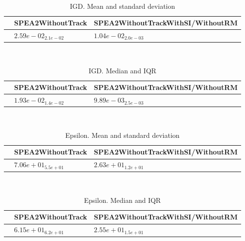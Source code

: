 \documentclass{article}
\begin{document}
\
\begin{table}
\caption{IGD. Mean and standard deviation}
\label{table:mean.IGD}
\centering
\begin{scriptsize}
\begin{tabular}{lll}
\hline & SPEA2WithoutTrack &  SPEA2WithoutTrackWithSI/WithoutRM\\
\hline
 & \cellcolor{gray25}$  2.59e-02_{ 2.1e-02}$ & \cellcolor{gray95}$  1.04e-02_{ 2.0e-03}$ \\
\hline
\end{tabular}
\end{scriptsize}
\end{table}
\
\begin{table}
\caption{IGD. Median and IQR}
\label{table:median.IGD}
\begin{scriptsize}
\centering
\begin{tabular}{lll}
\hline & SPEA2WithoutTrack &  SPEA2WithoutTrackWithSI/WithoutRM\\
\hline
 & \cellcolor{gray25}$  1.93e-02_{ 1.4e-02}$ & \cellcolor{gray95}$  9.89e-03_{ 2.5e-03}$ \\
\hline
\end{tabular}
\end{scriptsize}
\end{table}
\
\begin{table}
\caption{Epsilon. Mean and standard deviation}
\label{table:mean.Epsilon}
\centering
\begin{scriptsize}
\begin{tabular}{lll}
\hline & SPEA2WithoutTrack &  SPEA2WithoutTrackWithSI/WithoutRM\\
\hline
 & \cellcolor{gray25}$  7.06e+01_{ 5.5e+01}$ & \cellcolor{gray95}$  2.63e+01_{ 1.2e+01}$ \\
\hline
\end{tabular}
\end{scriptsize}
\end{table}
\
\begin{table}
\caption{Epsilon. Median and IQR}
\label{table:median.Epsilon}
\begin{scriptsize}
\centering
\begin{tabular}{lll}
\hline & SPEA2WithoutTrack &  SPEA2WithoutTrackWithSI/WithoutRM\\
\hline
 & \cellcolor{gray25}$  6.15e+01_{ 6.2e+01}$ & \cellcolor{gray95}$  2.55e+01_{ 1.5e+01}$ \\
\hline
\end{tabular}
\end{scriptsize}
\end{table}
\end{document}
